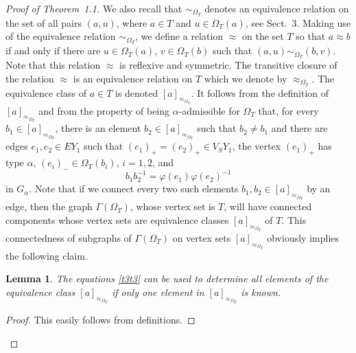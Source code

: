 \documentclass[10pt, reqno]{amsart}
\numberwithin{equation}{section}
\newtheorem{lem}[thm]{Lemma}
\begin{document}
\begin{proof}[Proof of Theorem~1.1]
We also recall that $\sim_{\Omega_T}$ denotes an equivalence relation on the set of all pairs $(a, u)$, where $a \in T$ and $u \in \Omega_T(a)$, see Sect.~3. Making use of the equivalence relation $\sim_{\Omega_T}$, we define a relation  $\approx$ on the set  $T$ so that $a \approx b$ if and only if  there are  $u \in \Omega_T(a)$, $v \in \Omega_T(b)$ such that $(a,u) \sim_{{{\Omega}}_T} (b,v)$.  Note that this relation $\approx $  is reflexive and symmetric. The transitive closure of  the relation $\approx $ is an equivalence relation on $T$ which we denote by  $\approx_{{{{\Omega}}_T} } $. The equivalence class of $a \in T$  is denoted  $[a]_{\approx_{{{\Omega}}_T}}$.   It follows from the definition of  $[a]_{\approx_{{{\Omega}}_T}}$ and from the property of being ${\alpha}$-admissible for ${{\Omega}}_T$ that, for every $b_1 \in
[a]_{\approx_{{{\Omega}}_T}}$, there is an element $b_2 \in [a]_{\approx_{{{\Omega}}_T}}$ such that $b_2 \ne b_1$ and there are edges $e_1, e_2 \in EY_1$ such that  $(e_1)_+ = (e_2)_+ \in V_S Y_1$, the vertex $(e_1)_+$ has  type ${\alpha}$, $(e_i)_- \in {{\Omega}}_T (b_i)$, $i =1,2$, and
\begin{equation}\label{t3t3}
    b_1 b_2^{-1} = {\varphi}(e_1) {\varphi}(e_2)^{-1}
\end{equation}
in $ G_{\alpha}$.
 Note that if we connect every two such elements $b_1, b_2 \in [a]_{\approx_{{{\Omega}}_T}}$  by an edge, then the graph $\Gamma({{\Omega}}_T)$,  whose vertex set is $T$, will have connected components whose vertex sets are equivalence classes  $[a]_{\approx_{{{\Omega}}_T}}$ of $T$.
This connectedness of subgraphs  of $\Gamma({{\Omega}}_T)$ on vertex sets
$[a]_{\approx_{{{\Omega}}_T}}$ obviously implies the following claim.

\begin{lem}\label{lem3t} The equations  \eqref{t3t3} can be used to determine all elements of the equivalence class  $[a]_{\approx_{{{\Omega}}_T}}$
if only one element in $[a]_{\approx_{{{\Omega}}_T}}$  is known.
\end{lem}

\begin{proof} This easily follows from definitions.
\end{proof}


\end{proof}
\end{document}

